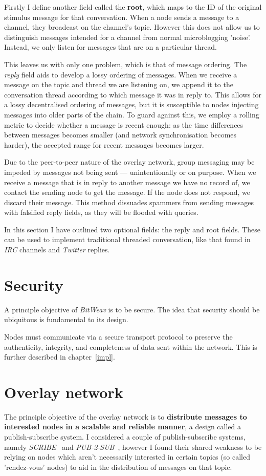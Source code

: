 \documentclass[10pt,a4paper,onecolumn]{article}
\begin{document}
Firstly I define another field called the \textbf{root}, which maps to the ID of the original stimulus message for that conversation. When a node sends a message to a channel, they broadcast on the channel's topic. However this does not allow us to distinguish messages intended for a channel from normal microblogging 'noise'. Instead, we only listen for messages that are on a particular thread. 

This leaves us with only one problem, which is that of message ordering. The \emph{reply} field aids to develop a lossy ordering of messages. When we receive a message on the topic and thread we are listening on, we append it to the conversation thread according to which message it was in reply to. This allows for a lossy decentralised ordering of messages, but it is susceptible to nodes injecting messages into older parts of the chain. To guard against this, we employ a rolling metric to decide whether a message is recent enough: as the time differences between messages becomes smaller (and network synchronisation becomes harder), the accepted range for recent messages becomes larger. 

Due to the peer-to-peer nature of the overlay network, group messaging may be impeded by messages not being sent — unintentionally or on purpose. When we receive a message that is in reply to another message we have no record of, we contact the sending node to get the message. If the node does not respond, we discard their message. This method dissuades spammers from sending messages with falsified reply fields, as they will be flooded with queries. 

In this section I have outlined two optional fields: the reply and root fields. These  can be used to implement traditional threaded conversation, like that found in \textit{IRC} channels and \textit{Twitter} replies.

\section{Security}
\label{security}
A principle objective of \textit{BitWeav} is to be secure. The idea that security should be ubiquitous is fundamental to its design.

Nodes must communicate via a secure transport protocol to preserve the authenticity, integrity, and completeness of data sent within the network. This is further described in chapter~\ref{impl}.

\section{Overlay network}
\label{network}
The principle objective of the overlay network is to \textbf{distribute messages to interested nodes in a scalable and reliable manner}, a design called a publish-subscribe system. I considered a couple of publish-subscribe systems, namely \textit{SCRIBE}~\cite{scribe} and \textit{PUB-2-SUB}~\cite{pub2sub}, however I found their shared weakness to be relying on nodes which aren't necessarily interested in certain topics (so called 'rendez-vous' nodes) to aid in the distribution of messages on that topic.
\end{document}
